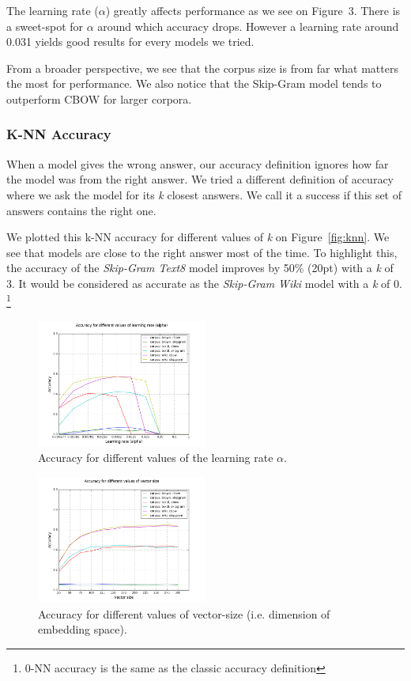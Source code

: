 \documentclass[conference]{IEEEtran}
\begin{document}
The learning rate ($\alpha$) greatly affects performance as we see on Figure~3.
There is a sweet-spot for $\alpha$ around which accuracy drops.
However a learning rate around 0.031 yields good results for every models we tried.

From a broader perspective, we see that the corpus size is from far what matters the most for performance.
We also notice that the Skip-Gram model tends to outperform CBOW for larger corpora.

\subsubsection{K-NN Accuracy}
When a model gives the wrong answer, our accuracy definition ignores how far the model was from the right answer.
We tried a different definition of accuracy where we ask the model for its \textit{k} closest answers.
We call it a success if this set of answers contains the right one.

We plotted this k-NN accuracy for different values of \textit{k} on Figure~\ref{fig:knn}.
We see that models are close to the right answer most of the time.
To highlight this, the accuracy of the \textit{Skip-Gram Text8} model improves by 50\% (20pt) with a \textit{k} of 3.
It would be considered as accurate as the \textit{Skip-Gram Wiki} model with a \textit{k} of 0.
\footnote{0-NN accuracy is the same as the classic accuracy definition}

\begin{figure}[t]
\centering
\includegraphics[width=0.5\textwidth]{graph_acc_alpha}
\caption{Accuracy for different values of the learning rate $\alpha$. }
\label{fig:alpha}
\end{figure}

\begin{figure}[t]
\centering
\includegraphics[width=0.5\textwidth]{graph_acc_size}
\caption{Accuracy for different values of vector-size (i.e. dimension of embedding space). }
\label{fig:size}
\end{figure}
\end{document}
